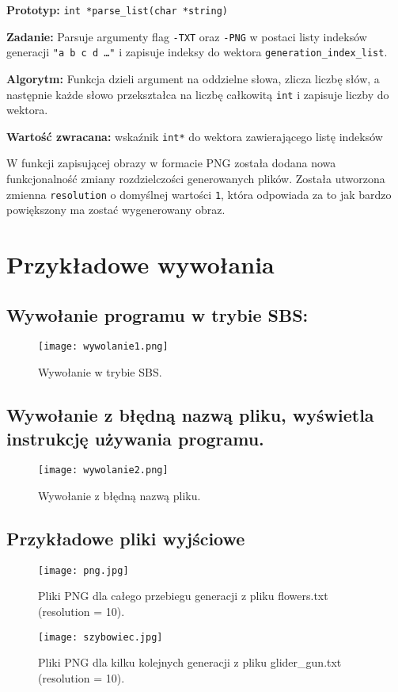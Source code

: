 \documentclass[12pt,a4paper,notitlepage]{report}
\begin{document}
\begin{flushleft}
\textbf{Prototyp:} \verb|int *parse_list(char *string)|\\
\end{flushleft}
\begin{flushleft}
\textbf{Zadanie:} Parsuje argumenty flag \verb|-TXT| oraz \verb|-PNG| w postaci listy indeksów generacji \verb|"a b c d …"| i zapisuje indeksy do wektora \verb|generation_index_list|.
\end{flushleft}
\begin{flushleft}
	\textbf{Algorytm:}
	Funkcja dzieli argument na oddzielne słowa, zlicza liczbę słów, a następnie każde słowo przekształca na liczbę całkowitą \verb|int| i zapisuje liczby do wektora.
\end{flushleft}
\begin{flushleft}
	\textbf{Wartość zwracana:} wskaźnik \verb|int*| do wektora zawierającego listę indeksów
\end{flushleft}
W funkcji zapisującej obrazy w formacie PNG została dodana nowa funkcjonalność zmiany rozdzielczości generowanych plików. Została utworzona zmienna \verb|resolution| o domyślnej wartości \verb|1|, która odpowiada za to jak bardzo powiększony ma zostać wygenerowany obraz.
\newpage
\section{Przykładowe wywołania}
\subsection{Wywołanie programu w trybie SBS:}
\begin{figure}[h!]
	\texttt{[image: wywolanie1.png]}
	\caption{Wywołanie w trybie SBS.}
\end{figure}

\subsection{Wywołanie z błędną nazwą pliku, wyświetla instrukcję używania programu.}
\begin{figure}[h!]
	\texttt{[image: wywolanie2.png]}
	\caption{Wywołanie z błędną nazwą pliku.}
\end{figure}
\newpage
\subsection{Przykładowe pliki wyjściowe}
\begin{figure}[h!]
	\texttt{[image: png.jpg]}
	\caption{Pliki PNG dla całego przebiegu generacji z pliku flowers.txt (resolution = 10).}
\end{figure}
\begin{figure}[h!]
	\texttt{[image: szybowiec.jpg]}
	\caption{Pliki PNG dla kilku kolejnych generacji z pliku glider\_gun.txt (resolution = 10).}
\end{figure}
\end{document}
